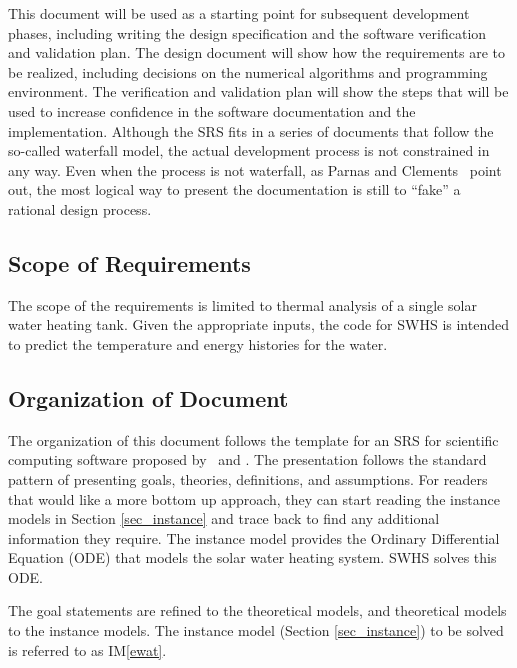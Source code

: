 \documentclass[12pt]{article}
\newcommand{\iref}[1]{IM\ref{#1}}
\newcommand{\progname}{SWHS}
\begin{document}
This document will be used as a starting point for subsequent development
phases, including writing the design specification and the software verification
and validation plan.  The design document will show how the requirements are to
be realized, including decisions on the numerical algorithms and programming
environment.  The verification and validation plan will show the steps that will
be used to increase confidence in the software documentation and the
implementation.  Although the SRS fits in a series of documents that follow the
so-called waterfall model, the actual development process is not constrained in
any way.  Even when the process is not waterfall, as Parnas and
Clements~\cite{ParnasAndClements1986} point out, the most logical way to present
the documentation is still to ``fake'' a rational design process.

\subsection{Scope of Requirements} 

The scope of the requirements is limited to thermal analysis of a single solar
water heating tank.
Given the appropriate inputs, the code
for \progname{} is intended to predict the temperature and energy histories for
the water.

\subsection{Organization of Document}

The organization of this document follows the template for an SRS for scientific
computing software proposed by~\cite{Koothoor2013} and \cite{SmithAndLai2005}.
The presentation follows the standard pattern of presenting goals, theories,
definitions, and assumptions.  For readers that would like a more bottom up
approach, they can start reading the instance models in Section
\ref{sec_instance} and trace back to find any additional information they
require.  The instance model provides the Ordinary Differential Equation (ODE)
that models the solar water heating system.
\progname{} solves this ODE.

The goal statements are refined to the theoretical models, and theoretical
models to the instance models.  The instance model (Section \ref{sec_instance})
to be solved is referred to as \iref{ewat}.%
\end{document}
